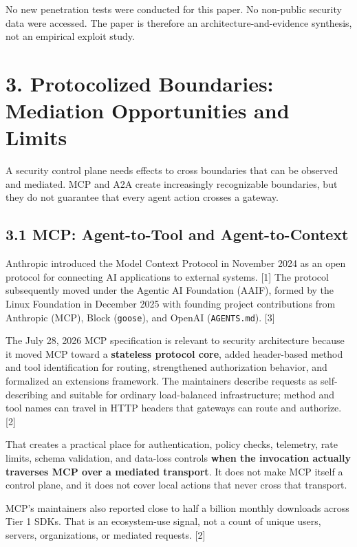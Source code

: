 \documentclass[
  10pt,
  letterpaper,
]{article}
\begin{document}
No new penetration tests were conducted for this paper. No non-public
security data were accessed. The paper is therefore an
architecture-and-evidence synthesis, not an empirical exploit study.

\section{3. Protocolized Boundaries: Mediation Opportunities and
Limits}\label{protocolized-boundaries-mediation-opportunities-and-limits}

A security control plane needs effects to cross boundaries that can be
observed and mediated. MCP and A2A create increasingly recognizable
boundaries, but they do not guarantee that every agent action crosses a
gateway.

\subsection{3.1 MCP: Agent-to-Tool and
Agent-to-Context}\label{mcp-agent-to-tool-and-agent-to-context}

Anthropic introduced the Model Context Protocol in November 2024 as an
open protocol for connecting AI applications to external systems.
{[}1{]} The protocol subsequently moved under the Agentic AI Foundation
(AAIF), formed by the Linux Foundation in December 2025 with founding
project contributions from Anthropic (MCP), Block (\texttt{goose}), and
OpenAI (\texttt{AGENTS.md}). {[}3{]}

The July 28, 2026 MCP specification is relevant to security architecture
because it moved MCP toward a \textbf{stateless protocol core}, added
header-based method and tool identification for routing, strengthened
authorization behavior, and formalized an extensions framework. The
maintainers describe requests as self-describing and suitable for
ordinary load-balanced infrastructure; method and tool names can travel
in HTTP headers that gateways can route and authorize. {[}2{]}

That creates a practical place for authentication, policy checks,
telemetry, rate limits, schema validation, and data-loss controls
\textbf{when the invocation actually traverses MCP over a mediated
transport}. It does not make MCP itself a control plane, and it does not
cover local actions that never cross that transport.

MCP's maintainers also reported close to half a billion monthly
downloads across Tier 1 SDKs. That is an ecosystem-use signal, not a
count of unique users, servers, organizations, or mediated requests.
{[}2{]}
\end{document}
